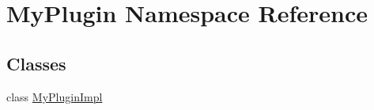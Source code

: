 \hypertarget{namespace_my_plugin}{\section{\-My\-Plugin \-Namespace \-Reference}
\label{namespace_my_plugin}
}
\subsection*{\-Classes}
\begin{DoxyCompactItemize}
\item 
class \hyperlink{class_my_plugin_1_1_my_plugin_impl}{\-My\-Plugin\-Impl}
\end{DoxyCompactItemize}
